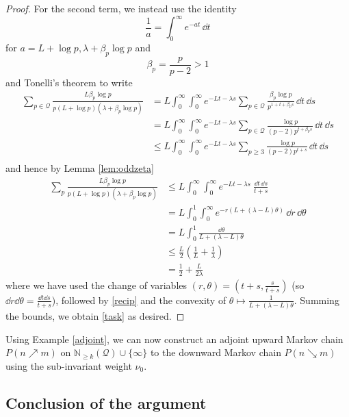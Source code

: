 \documentclass[12pt]{amsart}
\theoremstyle{definition}
\theoremstyle{remark}
\numberwithin{equation}{section}
\newcommand{\N}{{\mathbb N}}
\newcommand{\1}{{\mathbf 1}}
\begin{document}
\begin{proof}
For the second term, we instead use the identity
\begin{equation}\label{recip}
\frac1{a}=\int_0^\infty e^{-at}\,\dd t
\end{equation}
for $a = L + \log p, \lambda+\beta_p\log p$
and
$$ \beta_p = \frac{p}{p-2} > 1$$
and Tonelli's theorem to write
\begin{align*}
\sum_{p \in {\mathcal Q}} \frac{L \beta_p\log p}{p(L+\log p)(\lambda+\beta_p\log p)}  &=L\int_0^\infty\int_0^\infty
e^{-Lt-\lambda s}\sum_{p\in\mathcal Q}\frac{\beta_p\log p}{p^{1+t+\beta_p s}}\,\dd t\,\dd s \\
&= L\int_0^\infty\int_0^\infty e^{-Lt - \lambda s}\sum_{p\in\mathcal Q}\frac{\log p}{(p-2)p^{t+\beta_p s}}\,\dd t\,\dd s \\
&\leq L\int_0^\infty\int_0^\infty e^{-Lt - \lambda s}\sum_{p\ge 3}\frac{\log p}{(p-2)p^{t+s}}\,\dd t\,\dd s \\
\end{align*}
and hence by Lemma \ref{lem:oddzeta} 
\begin{align*}
\sum_p \frac{L \beta_p\log p}{p(L+\log p)(\lambda+\beta_p\log p)} &\le
L\int_0^\infty\int_0^\infty
e^{-Lt - \lambda s}\ \frac{\dd t\, \dd s}{t+s} \\
&= L\int_0^1\int_0^\infty e^{-r(L+(\lambda-L)\theta)}\,\dd r\,\dd \theta \\
&=L\int_0^1\frac{\dd\theta}{L+(\lambda-L)\theta}\\
&\leq \frac{L}{2} \left( \frac{1}{L} + \frac{1}{\lambda} \right)\\
&= \frac{1}{2} + \frac{L}{2\lambda}
\end{align*}
where we have used the change of variables $(r,\theta) = (t+s, \frac{s}{t+s})$ (so $\dd r \dd \theta = \frac{\dd t \dd s}{t+s}$), followed by \eqref{recip} and the convexity of $\theta \mapsto \frac{1}{L+(\lambda-L)\theta}$.  Summing the bounds, we obtain \eqref{task} as desired.
\end{proof}

Using Example \ref{adjoint}, we can now construct an adjoint upward Markov chain $P(n \nearrow m)$ on $\N_{\geq k}({\mathcal Q}) \cup \{\infty\}$ to the downward Markov chain $P(n \searrow m)$ using the sub-invariant weight $\nu_0$.

\subsection{Conclusion of the argument}
\end{document}
